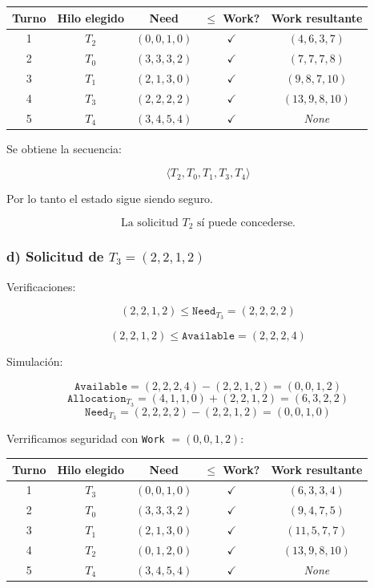 \documentclass[12pt,letterpaper]{article}
\begin{document}
\begin{center}
  \begin{tabular}{|c|c|c|c|c|}
    \hline
    \textbf{Turno} & \textbf{Hilo elegido} & \textbf{Need} & $\leq$ \textbf{Work}? & \textbf{Work resultante} \\
    \hline
    1 & $T_2$ & $(0,0,1,0)$ & $\checkmark$ & $(4,6,3,7)$ \\
    \hline
    2 & $T_0$ & $(3,3,3,2)$ & $\checkmark$ & $(7,7,7,8)$ \\
    \hline
    3 & $T_1$ & $(2,1,3,0)$ & $\checkmark$ & $(9,8,7,10)$ \\
    \hline
    4 & $T_3$ & $(2,2,2,2)$ & $\checkmark$ & $(13,9,8,10)$ \\
    \hline
    5 & $T_4$ & $(3,4,5,4)$ & $\checkmark$ & \textit{None} \\
    \hline
  \end{tabular}
\end{center}

Se obtiene la secuencia:

\[
\langle T_2, T_0, T_1, T_3, T_4 \rangle
\]

Por lo tanto el estado sigue siendo seguro.

\[
\boxed{\text{La solicitud $T_2$ sí puede concederse.}}
\]

\subsubsection*{d) Solicitud de $T_3 = (2,2,1,2)$}

Verificaciones:

\[
(2,2,1,2) \leq \texttt{Need}_{T_3}=(2,2,2,2)
\]

\[
(2,2,1,2) \leq \texttt{Available} = (2,2,2,4)
\]

Simulación:

\[
\texttt{Available}= (2,2,2,4) - (2,2,1,2) = (0,0,1,2)
\]
\[
\texttt{Allocation}_{T_3} = (4,1,1,0) + (2,2,1,2) = (6,3,2,2)
\]
\[
\texttt{Need}_{T_3} = (2,2,2,2) - (2,2,1,2) = (0,0,1,0)
\]

Verrificamos seguridad con \texttt{Work} $= (0,0,1,2)$:
\begin{center}
  \begin{tabular}{|c|c|c|c|c|}
    \hline
    \textbf{Turno} & \textbf{Hilo elegido} & \textbf{Need} & $\leq$ \textbf{Work}? & \textbf{Work resultante} \\
    \hline
    1 & $T_3$ & $(0,0,1,0)$ & $\checkmark$ & $(6,3,3,4)$ \\
    \hline
    2 & $T_0$ & $(3,3,3,2)$ & $\checkmark$ & $(9,4,7,5)$ \\
    \hline
    3 & $T_1$ & $(2,1,3,0)$ & $\checkmark$ & $(11,5,7,7)$ \\
    \hline
    4 & $T_2$ & $(0,1,2,0)$ & $\checkmark$ & $(13,9,8,10)$ \\
    \hline
    5 & $T_4$ & $(3,4,5,4)$ & $\checkmark$ & \textit{None} \\
    \hline
  \end{tabular}
\end{center}
\end{document}
